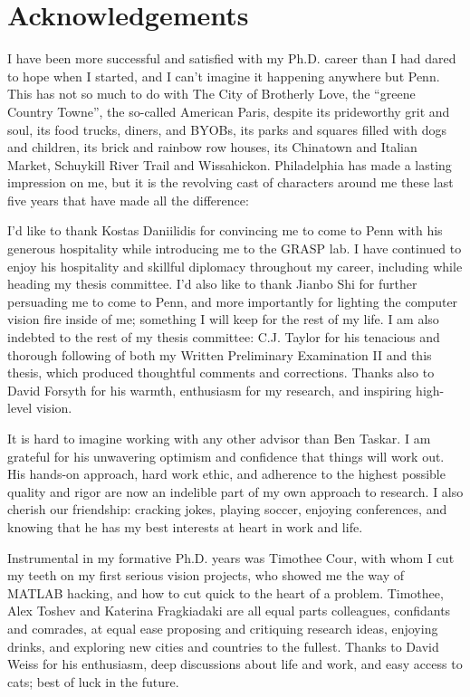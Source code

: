 \chapter*{Acknowledgements}
I have been more successful and satisfied with my Ph.D. career than I had dared 
to hope when I started, and I can't imagine it happening anywhere but Penn.  
This has not so much to do with The City of Brotherly Love, the ``greene 
Country Towne'', the so-called American Paris, despite its prideworthy grit and 
soul, its food trucks, diners, and BYOBs, its parks and squares filled with 
dogs and children, its brick and rainbow row houses, its Chinatown and Italian 
Market, Schuykill River Trail and Wissahickon.
Philadelphia has made a lasting impression on me, but it is the revolving cast 
of characters around me these last five years that have made all the 
difference:

I'd like to thank Kostas Daniilidis for convincing me to come to Penn with his 
generous hospitality while introducing me to the GRASP lab.  I have continued 
to enjoy his hospitality and skillful diplomacy throughout my career, including  
while
heading my thesis committee.  I'd also like to thank Jianbo Shi for further 
persuading me to come to Penn, and more importantly for lighting the computer 
vision fire inside of me; something I will keep for the rest of my life.
I am also indebted to the rest of my thesis committee: C.J. Taylor for his 
tenacious and thorough following of both my Written Preliminary Examination II 
and this thesis, which produced thoughtful comments and corrections.  Thanks 
also to David Forsyth for his warmth, enthusiasm for my research, and inspiring 
high-level vision.

It is hard to imagine working with any other advisor than Ben Taskar.  I am 
grateful for his unwavering optimism and confidence that things will work out.  
His hands-on approach, hard work ethic, and adherence to the highest possible 
quality and rigor are now an indelible part of my own approach to research.  I 
also cherish our friendship: cracking jokes, playing soccer, enjoying 
conferences, and knowing that he has my best interests at heart in work and 
life.

Instrumental in my formative Ph.D. years was Timothee Cour, with whom I cut my 
teeth on my first serious vision projects, who showed me the way of MATLAB 
hacking, and how to cut quick to the heart of a problem.  Timothee, Alex Toshev 
and Katerina Fragkiadaki are all equal parts colleagues, confidants and 
comrades, at equal ease proposing and critiquing research ideas, enjoying 
drinks, and exploring new cities and countries to the fullest.  Thanks to David 
Weiss for his enthusiasm, deep discussions about life and work, and easy access 
to cats; best of luck in the future.

